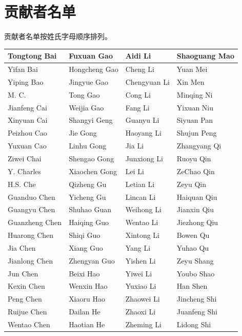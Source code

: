 \section{贡献者名单}\label{a-contributions}

贡献者名单按姓氏字母顺序排列。

{\def\LTcaptype{none} %
\begin{longtable}[]{@{}|l|l|l|l|@{}}
\toprule\noalign{}
\endhead
\bottomrule\noalign{}
\endlastfoot
\hline
Tongtong Bai & Fuxuan Gao & Aidi Li & Shaoguang Mao \\
\hline
Yifan Bai & Hongcheng Gao & Cheng Li & Yuan Mei \\
\hline
Yiping Bao & Jingyue Gao & Chengyuan Li & Xin Men \\
\hline
M. C. & Tong Gao & Cong Li & Minqing Ni \\
\hline
Jianfeng Cai & Weijia Gao & Fang Li & Yixuan Niu \\
\hline
Xinyuan Cai & Shangyi Geng & Guanyu Li & Siyuan Pan \\
\hline
Peizhou Cao & Jie Gong & Haoyang Li & Shujun Peng \\
\hline
Yuxuan Cao & Linhu Gong & Jia Li & Zhangyang Qi \\
\hline
Ziwei Chai & Shengao Gong & Junxiong Li & Ruoyu Qin \\
\hline
Y. Charles & Xiaochen Gong & Lei Li & ZeChao Qin \\
\hline
H.S. Che & Qizheng Gu & Letian Li & Zeyu Qin \\
\hline
Guanduo Chen & Yicheng Gu & Lincan Li & Haiquan Qiu \\
\hline
Guangyu Chen & Shuhao Guan & Weihong Li & Jianxin Qiu \\
\hline
Guanzheng Chen & Haiqing Guo & Wentao Li & Jiezhong Qiu \\
\hline
Huarong Chen & Shiqi Guo & Xintong Li & Bowen Qu \\
\hline
Jia Chen & Xiang Guo & Yang Li & Yuhao Qu \\
\hline
Jianlong Chen & Zhengyan Guo & Yishen Li & Zeyu Shang \\
\hline
Jun Chen & Beixi Hao & Yiwei Li & Youbo Shao \\
\hline
Kexin Chen & Wenxin Hao & Yuxiao Li & Han Shen \\
\hline
Peng Chen & Xiaoru Hao & Zhaowei Li & Jincheng Shi \\
\hline
Ruijue Chen & Dailan He & Zhaoxi Li & Juanfeng Shi \\
\hline
Wentao Chen & Haotian He & Zheming Li & Lidong Shi \\

\end{longtable}}
